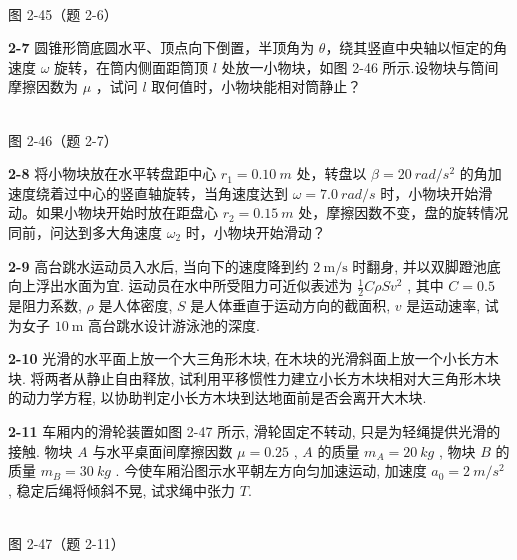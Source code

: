 \begin{center}
\resizebox{0.50\textwidth}{!}{}\\[4pt]
{\small 图 2-45（题 2-6）}
\end{center}

\newpage

\textbf{2-7} 圆锥形筒底圆水平、顶点向下倒置，半顶角为 $\theta$，绕其竖直中央轴以恒定的角速度 $\omega$ 旋转，在筒内侧面距筒顶 $l$ 处放一小物块，如图 2-46 所示.设物块与筒间摩擦因数为 $\mu$ ，试问 $l$ 取何值时，小物块能相对筒静止？

\begin{center}
\resizebox{0.30\textwidth}{!}{}\\[4pt]
{\small 图 2-46（题 2-7）}
\end{center}

\newpage

\textbf{2-8} 将小物块放在水平转盘距中心 $r_{1}=0.10\ m$ 处，转盘以 $\beta=20\ rad/s^{2}$ 的角加速度绕着过中心的竖直轴旋转，当角速度达到 $\omega=7.0\ rad/s$ 时，小物块开始滑动。如果小物块开始时放在距盘心 $r_{2}=0.15\ m$ 处，摩擦因数不变，盘的旋转情况同前，问达到多大角速度 $\omega_{2}$ 时，小物块开始滑动？

\newpage

\textbf{2-9} 高台跳水运动员入水后, 当向下的速度降到约 $2 \mathrm{~m} / \mathrm{s}$ 时翻身, 并以双脚蹬池底向上浮出水面为宜. 运动员在水中所受阻力可近似表述为 $\frac{1}{2} C \rho S v^{2}$ , 其中 $C = 0.5$ 是阻力系数, $\rho$ 是人体密度, $S$ 是人体垂直于运动方向的截面积, $v$ 是运动速率, 试为女子 $10 \mathrm{~m}$ 高台跳水设计游泳池的深度.

\newpage

\textbf{2-10} 光滑的水平面上放一个大三角形木块, 在木块的光滑斜面上放一个小长方木块. 将两者从静止自由释放, 试利用平移惯性力建立小长方木块相对大三角形木块的动力学方程, 以协助判定小长方木块到达地面前是否会离开大木块.

\newpage

\textbf{2-11} 车厢内的滑轮装置如图 2-47 所示, 滑轮固定不转动, 只是为轻绳提供光滑的接触. 物块 $A$ 与水平桌面间摩擦因数 $\mu=0.25$ , $A$ 的质量 $m_{A}=20\ kg$ , 物块 $B$ 的质量 $m_{B}=30\ kg$ . 今使车厢沿图示水平朝左方向匀加速运动, 加速度 $a_{0}=2\ m/s^{2}$ , 稳定后绳将倾斜不晃, 试求绳中张力 $T$.

\begin{center}
\resizebox{0.50\textwidth}{!}{}\\[4pt]
{\small 图 2-47（题 2-11）}
\end{center}

